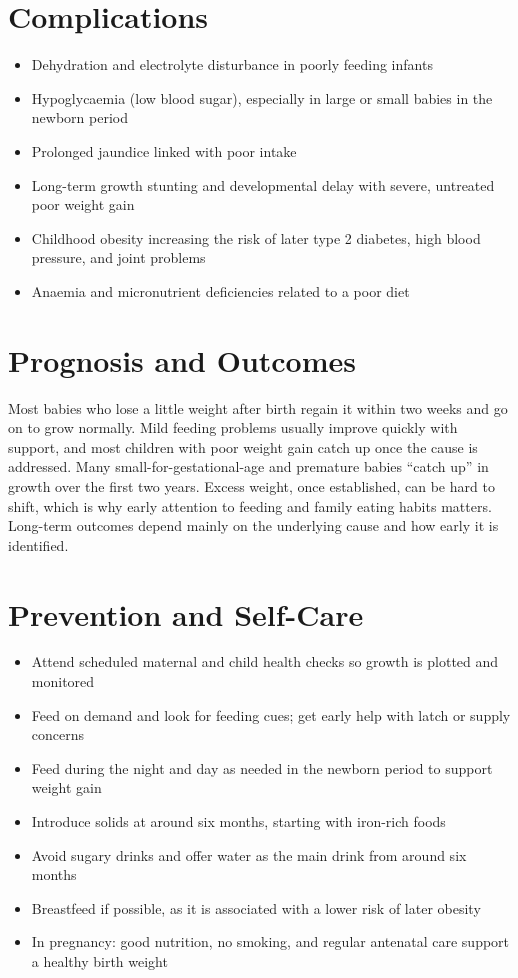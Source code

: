 \section*{Complications}
\begin{itemize}
    \item Dehydration and electrolyte disturbance in poorly feeding infants
    \item Hypoglycaemia (low blood sugar), especially in large or small babies in the newborn period
    \item Prolonged jaundice linked with poor intake
    \item Long-term growth stunting and developmental delay with severe, untreated poor weight gain
    \item Childhood obesity increasing the risk of later type 2 diabetes, high blood pressure, and joint problems
    \item Anaemia and micronutrient deficiencies related to a poor diet
\end{itemize}

\section*{Prognosis and Outcomes}
Most babies who lose a little weight after birth regain it within two weeks and go on to grow normally. Mild feeding problems usually improve quickly with support, and most children with poor weight gain catch up once the cause is addressed. Many small-for-gestational-age and premature babies ``catch up'' in growth over the first two years. Excess weight, once established, can be hard to shift, which is why early attention to feeding and family eating habits matters. Long-term outcomes depend mainly on the underlying cause and how early it is identified.

\section*{Prevention and Self-Care}
\begin{itemize}
    \item Attend scheduled maternal and child health checks so growth is plotted and monitored
    \item Feed on demand and look for feeding cues; get early help with latch or supply concerns
    \item Feed during the night and day as needed in the newborn period to support weight gain
    \item Introduce solids at around six months, starting with iron-rich foods
    \item Avoid sugary drinks and offer water as the main drink from around six months
    \item Breastfeed if possible, as it is associated with a lower risk of later obesity
    \item In pregnancy: good nutrition, no smoking, and regular antenatal care support a healthy birth weight
\end{itemize}

